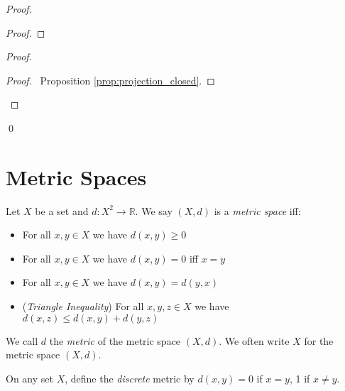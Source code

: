 \begin{proof}
\pf
{}
\begin{proof}
\end{proof}
\begin{proof}
	\begin{proof}
		\pf\ Proposition \ref{prop:projection_closed}.
	\end{proof}
\end{proof}
\qed
\end{proof}

\chapter{Metric Spaces}

\begin{df}
Let $X$ be a set and $d : X^2 \rightarrow \mathbb{R}$. We say $(X,d)$ is a \emph{metric space} iff:
\begin{itemize}
\item For all $x,y \in X$ we have $d(x,y) \geq 0$
\item For all $x,y \in X$ we have $d(x,y) = 0$ iff $x = y$
\item For all $x,y \in X$ we have $d(x,y) = d(y,x)$
\item (\emph{Triangle Inequality}) For all $x,y,z \in X$ we have $d(x,z) \leq d(x,y) + d(y,z)$
\end{itemize}
We call $d$ the \emph{metric} of the metric space $(X,d)$. We often write $X$ for the metric space $(X,d)$.
\end{df}

\begin{df}
On any set $X$, define the \emph{discrete} metric by $d(x,y) = 0$ if $x = y$, 1 if $x \neq y$.
\end{df}

